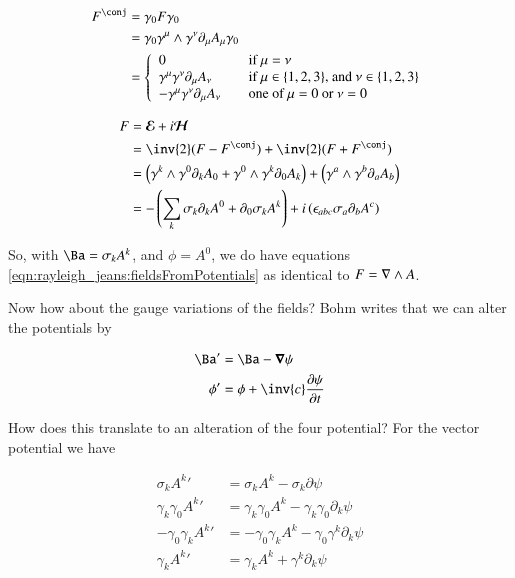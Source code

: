 \begin{align*}
F^\conj &=\gamma_0 F \gamma_0 \\
&= \gamma_0 \gamma^\mu \wedge \gamma^\nu \partial_\mu A_\mu \gamma_0 \\
&=
\left\{
\begin{array}{l l}
0 & \quad \mbox{if $\mu = \nu$} \\
\gamma^\mu \gamma^\nu \partial_\mu A_\nu & \quad \mbox{if $\mu \in \{1,2,3\}$, and $\nu \in \{1,2,3\}$} \\
-\gamma^\mu \gamma^\nu \partial_\mu A_\nu & \quad \mbox{one of $\mu = 0$ or $\nu = 0$ } \\
\end{array} \right.
\end{align*}

\begin{align*}
F 
&= \EE + i\HH \\
&= \inv{2}(F - F^\conj) + \inv{2}(F + F^\conj) \\
&= \left(\gamma^k \wedge \gamma^0 \partial_k A_0 +\gamma^0 \wedge \gamma^k \partial_0 A_k\right) + \left(\gamma^a \wedge \gamma^b \partial_a A_b\right) \\
&= -\left(\sum_k \sigma_k \partial_k A^0 + \partial_0 \sigma_k A^k\right) + i\left(\epsilon_{abc}\sigma_a \partial_b A^c\right) \\
\end{align*}

So, with $\Ba = \sigma_k A^k$, and $\phi = A^0$, we do have equations \ref{eqn:rayleigh_jeans:fieldsFromPotentials} as identical to $F = \nabla \wedge A$.

Now how about the gauge variations of the fields?  Bohm writes that we can alter the potentials by

\begin{align}\label{eqn:rayleigh_jeans:gauge}
\Ba' &= \Ba - \spacegrad \psi \\
\phi' &= \phi + \inv{c}\PD{t}{\psi}
\end{align}

How does this translate to an alteration of the four potential?  For the vector potential we have

\begin{align*}
\sigma_k {A^k}' &= \sigma_k A^k - \sigma_k \partial \psi \\
\gamma_k \gamma_0 {A^k}' &= \gamma_k \gamma_0 A^k - \gamma_k \gamma_0 \partial_k \psi \\
-\gamma_0 \gamma_k {A^k}' &= -\gamma_0 \gamma_k A^k - \gamma_0 \gamma^k \partial_k \psi \\
\gamma_k {A^k}' &= \gamma_k A^k + \gamma^k \partial_k \psi \\
\end{align*}

